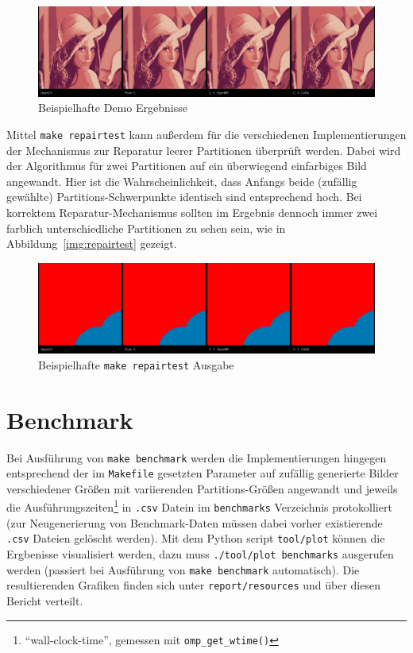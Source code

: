 \documentclass[
    bibliography=totoc, cd=lightcolor, cdmath=false, ngerman]{tudscrreprt}
\begin{document}
\begin{figure}[htbp]
  \centering
    \includegraphics[width=\textwidth]{report/resources/demo_results.jpg}
  \caption{Beispielhafte Demo Ergebnisse}
  \label{img:demoresults}
\end{figure}

Mittel \texttt{make repairtest} kann außerdem für die verschiedenen
Implementierungen der Mechanismus zur Reparatur leerer Partitionen überprüft
werden. Dabei wird der Algorithmus für zwei Partitionen auf ein überwiegend
einfarbiges Bild angewandt. Hier ist die Wahrscheinlichkeit, dass Anfangs beide
(zufällig gewählte) Partitions-Schwerpunkte identisch sind entsprechend hoch.
Bei korrektem Reparatur-Mechanismus sollten im Ergebnis dennoch immer zwei
farblich unterschiedliche Partitionen zu sehen sein, wie in
Abbildung~\ref{img:repairtest} gezeigt.

\begin{figure}[htbp]
  \centering
    \includegraphics[width=\textwidth]{report/resources/repairtest_results.jpg}
  \caption{Beispielhafte \texttt{make repairtest} Ausgabe}
  \label{img:demoresults}
\end{figure}

\section{Benchmark}

Bei Ausführung von \texttt{make benchmark} werden die Implementierungen
hingegen entsprechend der im \texttt{Makefile} gesetzten Parameter auf zufällig
generierte Bilder verschiedener Größen mit variierenden Partitions-Größen
angewandt und jeweils die Ausführungszeiten\footnote{``wall-clock-time'',
gemessen mit \texttt{omp\_get\_wtime()}} in \texttt{.csv} Datein im
\texttt{benchmarks} Verzeichnis protokolliert (zur Neugenerierung von
Benchmark-Daten müssen dabei vorher existierende \texttt{.csv} Dateien gelöscht
werden). Mit dem Python script \texttt{tool/plot} können die Ergbenisse
visualisiert werden, dazu muss \texttt{./tool/plot benchmarks} ausgerufen
werden (passiert bei Ausführung von \texttt{make benchmark} automatisch). Die
resultierenden Grafiken finden sich unter \texttt{report/resources} und über
diesen Bericht verteilt.
\end{document}
